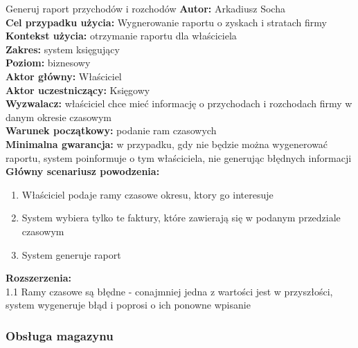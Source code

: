 	\begin{usecase}{Generuj raport przychodów i rozchodów}
		\textbf{Autor:} Arkadiusz Socha\\
		\textbf{Cel przypadku użycia:} Wygnerowanie raportu o zyskach i stratach firmy \\
		\textbf{Kontekst użycia:} otrzymanie raportu dla właściciela  \\
		\textbf{Zakres:} system księgujący \\
		\textbf{Poziom:} biznesowy \\
		\textbf{Aktor główny:} Właściciel \\
		\textbf{Aktor uczestniczący:} Księgowy \\
		\textbf{Wyzwalacz:} właściciel chce mieć informację o przychodach i rozchodach firmy w danym okresie czasowym \\
		\textbf{Warunek początkowy:} podanie ram czasowych  \\
		\textbf{Minimalna gwarancja:} w przypadku, gdy nie będzie można wygenerować raportu, system poinformuje o tym właściciela, nie generując błędnych informacji \\
		\textbf{Główny scenariusz powodzenia:} 
			\begin{enumerate}
				\item Właściciel podaje ramy czasowe okresu, ktory go interesuje
				\item System wybiera tylko te faktury, które zawierają się w podanym przedziale czasowym
				\item System generuje raport
			\end{enumerate}
		\textbf{Rozszerzenia:} \\
		1.1 Ramy czasowe są błędne - conajmniej jedna z wartości jest w przyszłości, system wygeneruje błąd i poprosi o ich ponowne wpisanie
	\end{usecase}

\subsubsection{Obsługa magazynu}

